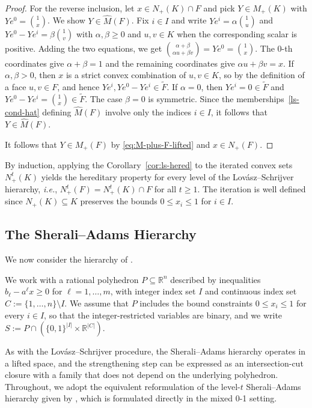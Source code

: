 \documentclass{article}
\newcommand{\R}{\mathbb{R}}
\newcommand{\ie} {{\em i.e.\/}, }
\begin{document}
\begin{proof}
    For the reverse inclusion, let $x \in N_+(K) \cap F$ and pick $Y \in M_+(K)$ with $Ye^0 = \binom{1}{x}$. We show $Y \in \hat M(F)$. Fix $i \in I$ and write $Ye^i = \alpha\binom{1}{u}$ and $Ye^0 - Ye^i = \beta\binom{1}{v}$ with $\alpha, \beta \geq 0$ and $u, v \in K$ when the corresponding scalar is positive. Adding the two equations, we get $\binom{\alpha + \beta}{\alpha u + \beta v} = Ye^0 = \binom{1}{x}$.
    The $0$-th coordinates give $\alpha + \beta = 1$ and the remaining coordinates give $\alpha u + \beta v = x$. If $\alpha, \beta > 0$, then $x$ is a strict convex combination of $u, v \in K$, so by the definition of a face $u, v \in F$, and hence $Ye^i, Ye^0 - Ye^i \in \tilde F$. If $\alpha = 0$, then $Ye^i = 0 \in \tilde F$ and $Ye^0 - Ye^i = \binom{1}{x} \in \tilde F$. The case $\beta = 0$ is symmetric. Since the memberships~\eqref{ls-cond-hat} defining $\hat M(F)$ involve only the indices $i \in I$, it follows that $Y \in \hat M(F)$.
    
    It follows that $Y \in M_+(F)$ by \eqref{eq:M-plus-F-lifted} and $x \in N_+(F)$.
\end{proof}

By induction, applying the Corollary~\ref{cor:ls-hered} to the iterated convex sets $N_+^t(K)$ yields the hereditary property for every level of the Lov\'asz--Schrijver hierarchy, \ie $N_+^t(F) = N_+^t(K) \cap F$ for all $t \geq 1$. The iteration is well defined since $N_+(K) \subseteq K$ preserves the bounds $0 \leq x_i \leq 1$ for $i \in I$.

\subsection{The Sherali--Adams Hierarchy} \label{sec:sherali-adams}

We now consider the hierarchy of \cite{sherali1990hierarchy}. 

We work with a rational polyhedron $P \subseteq \R^n$ described by inequalities $b_\ell - {a^\ell} x \geq 0$ for $\ell = 1,\dots,m$, with integer index set $I$ and continuous index set $C := \{1,\ldots,n\} \setminus I$. We assume that $P$ includes the bound constraints $0 \leq x_i \leq 1$ for every $i \in I$, so that the integer-restricted variables are binary, and we write $S := P \cap (\{0,1\}^{|I|} \times \R^{|C|})$.

As with the Lov\'asz--Schrijver procedure, the Sherali--Adams hierarchy operates in a lifted space, and the strengthening step can be expressed as an intersection-cut closure with a family that does not depend on the underlying polyhedron. Throughout, we adopt the equivalent reformulation of the level-$t$ Sherali--Adams hierarchy given by \cite{bodur2017new}, which is formulated directly in the mixed 0-1 setting.
\end{document}
